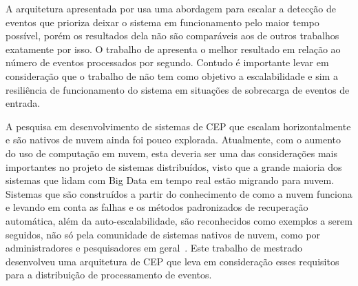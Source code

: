 A arquitetura apresentada por \cite{6906776} usa uma abordagem para escalar a detecção de eventos que prioriza deixar o sistema em funcionamento pelo maior tempo possível, porém os resultados dela não são comparáveis aos de outros trabalhos exatamente por isso. O trabalho de \cite{Isoyama:2012:SCE:2335484.2335498} apresenta o melhor resultado em relação ao número de eventos processados por segundo. Contudo é importante levar em consideração que o trabalho de \cite{6906776} não tem como objetivo a escalabilidade e sim a resiliência de funcionamento do sistema em situações de sobrecarga de eventos de entrada.




A pesquisa em desenvolvimento de sistemas de CEP que escalam horizontalmente e são nativos de nuvem ainda foi pouco explorada.
Atualmente, com o aumento do uso de computação em nuvem, esta deveria ser uma das considerações mais importantes no projeto de sistemas distribuídos, visto que a grande maioria dos sistemas que lidam com Big Data em tempo real estão migrando para nuvem. Sistemas que são construídos a partir do conhecimento de como a nuvem funciona e levando em conta as falhas e os métodos padronizados de recuperação automática, além da auto-escalabilidade, são reconhecidos como exemplos a serem seguidos, não só pela comunidade de sistemas nativos de nuvem, como por administradores e pesquisadores em geral~\citep{garrison2017cloud,richardson2018microservices,fregly2021data,grant2020kubeflow,davis2019cloud,gilbert2018cloud}.
Este trabalho de mestrado desenvolveu uma arquitetura de CEP que leva em consideração esses requisitos para a distribuição de processamento de eventos.




